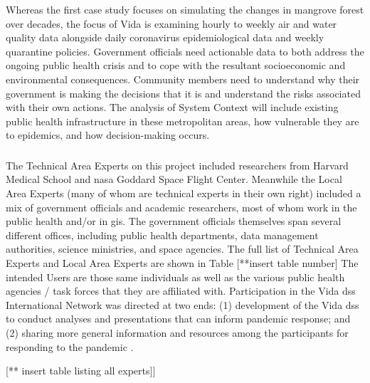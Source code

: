 Whereas the first case study focuses on simulating the changes in mangrove forest over decades, the focus of Vida is examining hourly to weekly air and water quality data alongside daily coronavirus epidemiological data and weekly quarantine policies. Government officials need actionable data to both address the ongoing public health crisis and to cope with the resultant socioeconomic and environmental consequences. Community members need to understand why their government is making the decisions that it is and understand the risks associated with their own actions. The analysis of System Context will include existing public health infrastructure in these metropolitan areas, how vulnerable they are to epidemics, and how decision-making occurs.  


\subsubsection{}

The Technical Area Experts on this project included researchers from Harvard Medical School and \ac{nasa} Goddard Space Flight Center. Meanwhile the Local Area Experts (many of whom are technical experts in their own right) included a mix of government officials and academic researchers, most of whom work in the public health and/or in \ac{gis}. The government officials themselves span several different offices, including public health departments, data management authorities, science ministries, and space agencies. The full list of Technical Area Experts and Local Area Experts are shown in Table [**insert table number] The intended Users are those same individuals as well as the various public health agencies / task forces that they are affiliated with.  Participation in the Vida \ac{dss} International Network was directed at two ends: (1) development of the Vida \ac{dss} to conduct analyses and presentations that can inform pandemic response; and (2) sharing more general information and resources among the participants for responding to the pandemic \cite{lombardoDesigningDecisionSupport2020}.

[** insert table listing all experts]]


